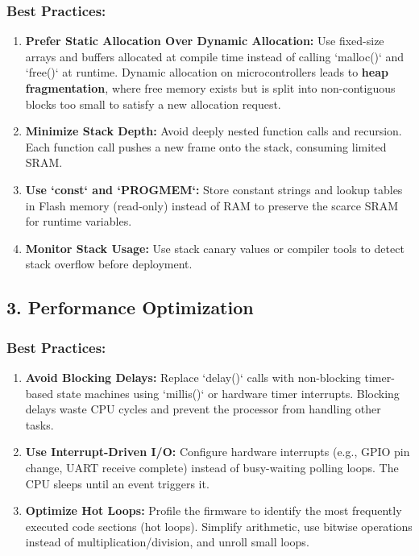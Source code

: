 \subsubsection{Best Practices:}
\begin{enumerate}
  \item \textbf{Prefer Static Allocation Over Dynamic Allocation:} Use fixed-size arrays and buffers allocated at compile time instead of calling `malloc()` and `free()` at runtime. Dynamic allocation on microcontrollers leads to \textbf{heap fragmentation}, where free memory exists but is split into non-contiguous blocks too small to satisfy a new allocation request.
  \item \textbf{Minimize Stack Depth:} Avoid deeply nested function calls and recursion. Each function call pushes a new frame onto the stack, consuming limited SRAM.
  \item \textbf{Use `const` and `PROGMEM`:} Store constant strings and lookup tables in Flash memory (read-only) instead of RAM to preserve the scarce SRAM for runtime variables.
  \item \textbf{Monitor Stack Usage:} Use stack canary values or compiler tools to detect stack overflow before deployment.
\end{enumerate}


\subsection{3. Performance Optimization}

\subsubsection{Best Practices:}
\begin{enumerate}
  \item \textbf{Avoid Blocking Delays:} Replace `delay()` calls with non-blocking timer-based state machines using `millis()` or hardware timer interrupts. Blocking delays waste CPU cycles and prevent the processor from handling other tasks.
  \item \textbf{Use Interrupt-Driven I/O:} Configure hardware interrupts (e.g., GPIO pin change, UART receive complete) instead of busy-waiting polling loops. The CPU sleeps until an event triggers it.
  \item \textbf{Optimize Hot Loops:} Profile the firmware to identify the most frequently executed code sections (hot loops). Simplify arithmetic, use bitwise operations instead of multiplication/division, and unroll small loops.
\end{enumerate}


